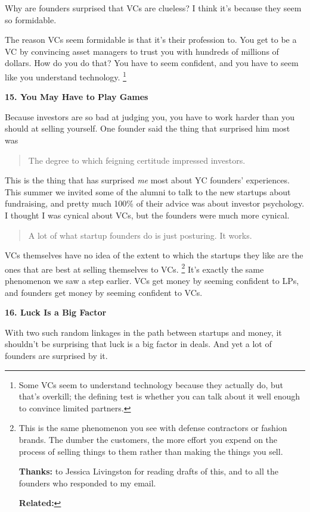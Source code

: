 \documentclass[12pt]{book}
\begin{document}
Why are founders surprised that VCs are clueless? I think it's because
they seem so formidable.

The reason VCs seem formidable is that it's their profession to. You get
to be a VC by convincing asset managers to trust you with hundreds of
millions of dollars. How do you do that? You have to seem confident, and
you have to seem like you understand technology. \footnote{Some VCs seem to understand technology because they actually do,
but that's overkill; the defining test is whether you can talk about it
well enough to convince limited partners.}

\textbf{15. You May Have to Play Games}

Because investors are so bad at judging you, you have to work harder
than you should at selling yourself. One founder said the thing that
surprised him most was

\begin{quote}
The degree to which feigning certitude impressed investors.
\end{quote}

This is the thing that has surprised \emph{me} most about YC founders'
experiences. This summer we invited some of the alumni to talk to the
new startups about fundraising, and pretty much 100\% of their advice
was about investor psychology. I thought I was cynical about VCs, but
the founders were much more cynical.

\begin{quote}
A lot of what startup founders do is just posturing. It works.
\end{quote}

VCs themselves have no idea of the extent to which the startups they
like are the ones that are best at selling themselves to VCs.
\footnote{This is the same phenomenon you see with defense contractors or
fashion brands. The dumber the customers, the more effort you expend on
the process of selling things to them rather than making the things you
sell.

\textbf{Thanks:} to Jessica Livingston for reading drafts of this, and
to all the founders who responded to my email.

\textbf{Related:}} It's exactly the same phenomenon we saw a step
earlier. VCs get money by seeming confident to LPs, and founders get
money by seeming confident to VCs.

\textbf{16. Luck Is a Big Factor}

With two such random linkages in the path between startups and money, it
shouldn't be surprising that luck is a big factor in deals. And yet a
lot of founders are surprised by it.
\end{document}
